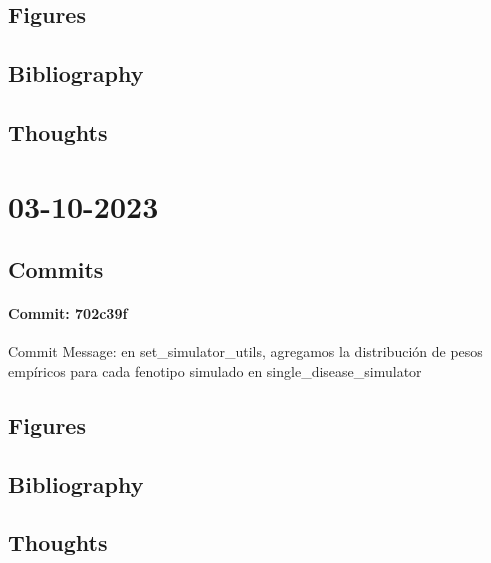 \documentclass{article}
\begin{document}
\subsection{Figures}
\subsection{Bibliography}
\subsection{Thoughts}

\section{03-10-2023}
\subsection{Commits}
\paragraph{Commit: 702c39f}
Commit Message: en set_simulator_utils, agregamos la distribución de pesos empíricos para cada fenotipo simulado en single_disease_simulator

\subsection{Figures}
\subsection{Bibliography}
\subsection{Thoughts}
\end{document}
